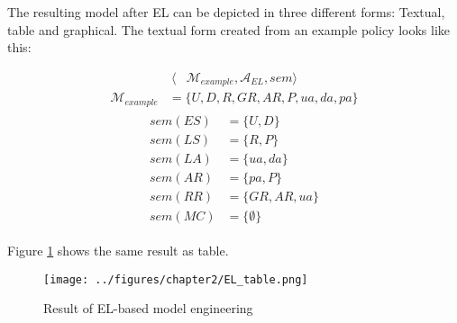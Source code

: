 \documentclass[twoside, openright, 12pt]{book}
\begin{document}


\noindent
The resulting model after EL can be depicted in three different forms: Textual, table and graphical.
The textual form created from an example policy looks like this:

\begin{align}
\langle &\mathcal{M}_{\mathit{example}}, \mathcal{A}_{EL}, sem \rangle
\label{EL_Aspect}
\end{align}
\begin{align}
\mathcal{M}_{\mathit{example}} &= \lbrace U, D, R, \mathit{GR}, \mathit{AR}, P, \mathit{ua}, \mathit{da}, \mathit{pa} \rbrace
\label{EL_M}
\end{align}
\begin{align}
\begin{split}
sem(\mathit{ES}) &= \lbrace U, D \rbrace\\
sem(\mathit{LS}) &= \lbrace R, P \rbrace\\
sem(\mathit{LA}) &= \lbrace \mathit{ua}, \mathit{da} \rbrace\\
sem(\mathit{AR}) &= \lbrace \mathit{pa}, P \rbrace\\
sem(\mathit{RR}) &= \lbrace \mathit{GR}, \mathit{AR}, \mathit{ua} \rbrace\\
sem(\mathit{MC}) &= \lbrace \emptyset \rbrace
\end{split}
\label{EL_sem}
\end{align}

\noindent
Figure \ref{fig:EL_table} shows the same result as table.

\begin{figure}[htb]
	\centering
	\texttt{[image: ../figures/chapter2/EL\_table.png]}
	\caption{Result of EL-based model engineering \cite[p.77, table 4.1]{Amthor18}}
	\label{fig:EL_table}
\end{figure}
\end{document}
